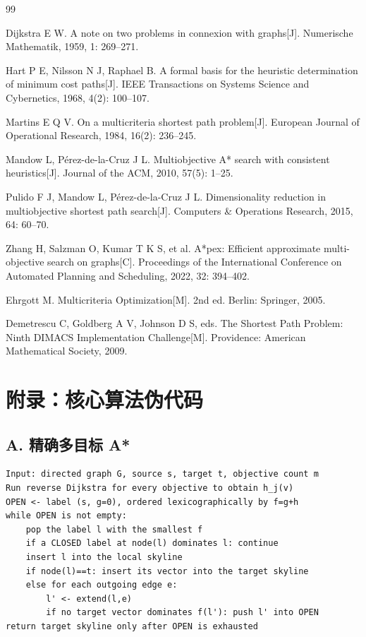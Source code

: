 \documentclass[UTF8,a4paper]{ctexart}
\begin{document}
\renewcommand{\refname}{九、\quad 参考文献}
\begin{thebibliography}{99}

Dijkstra E W. A note on two problems in connexion with graphs[J].
Numerische Mathematik, 1959, 1: 269--271.

Hart P E, Nilsson N J, Raphael B. A formal basis for the heuristic determination of minimum cost paths[J].
IEEE Transactions on Systems Science and Cybernetics, 1968, 4(2): 100--107.

Martins E Q V. On a multicriteria shortest path problem[J].
European Journal of Operational Research, 1984, 16(2): 236--245.

Mandow L, P\'erez-de-la-Cruz J L. Multiobjective A* search with consistent heuristics[J].
Journal of the ACM, 2010, 57(5): 1--25.

Pulido F J, Mandow L, P\'erez-de-la-Cruz J L. Dimensionality reduction in multiobjective shortest path search[J].
Computers \& Operations Research, 2015, 64: 60--70.

Zhang H, Salzman O, Kumar T K S, et al. A*pex: Efficient approximate multi-objective search on graphs[C].
Proceedings of the International Conference on Automated Planning and Scheduling, 2022, 32: 394--402.

Ehrgott M. Multicriteria Optimization[M]. 2nd ed. Berlin: Springer, 2005.

Demetrescu C, Goldberg A V, Johnson D S, eds. The Shortest Path Problem: Ninth DIMACS Implementation Challenge[M].
Providence: American Mathematical Society, 2009.

\end{thebibliography}

\newpage
\section*{附录：核心算法伪代码}

\subsection*{A. 精确多目标 A*}
\begin{lstlisting}[language={}]
Input: directed graph G, source s, target t, objective count m
Run reverse Dijkstra for every objective to obtain h_j(v)
OPEN <- label (s, g=0), ordered lexicographically by f=g+h
while OPEN is not empty:
    pop the label l with the smallest f
    if a CLOSED label at node(l) dominates l: continue
    insert l into the local skyline
    if node(l)==t: insert its vector into the target skyline
    else for each outgoing edge e:
        l' <- extend(l,e)
        if no target vector dominates f(l'): push l' into OPEN
return target skyline only after OPEN is exhausted
\end{lstlisting}
\end{document}
